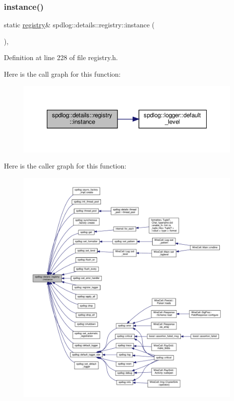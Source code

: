 \subsubsection{\texorpdfstring{instance()}{instance()}}
{\footnotesize\ttfamily static \hyperlink{classspdlog_1_1details_1_1registry}{registry}\& spdlog\+::details\+::registry\+::instance (\begin{DoxyParamCaption}{ }\end{DoxyParamCaption})\hspace{0.3cm}{\ttfamily [inline]}, {\ttfamily [static]}}



Definition at line 228 of file registry.\+h.

Here is the call graph for this function\+:
\nopagebreak
\begin{figure}[H]
\begin{center}
\leavevmode
\includegraphics[width=347pt]{classspdlog_1_1details_1_1registry_a58a1bbb352f751f6b729bc57bfadd6be_cgraph}
\end{center}
\end{figure}
Here is the caller graph for this function\+:
\nopagebreak
\begin{figure}[H]
\begin{center}
\leavevmode
\includegraphics[width=350pt]{classspdlog_1_1details_1_1registry_a58a1bbb352f751f6b729bc57bfadd6be_icgraph}
\end{center}
\end{figure}
